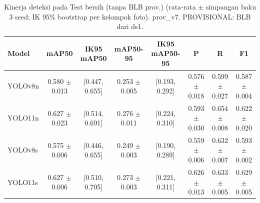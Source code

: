 \begin{table}[!t]
\centering
\caption{Kinerja deteksi pada Test bersih (tanpa BLB prov.) (rata-rata $\pm$ simpangan baku 3 seed; IK 95\% bootstrap per kelompok foto). prov\_v7. PROVISIONAL: BLB dari ds1.}
\label{tab:utama_test_bersih}
\footnotesize
\begin{tabular}{lccccccc}
\hline
\textbf{Model} & \textbf{mAP50} & \textbf{IK95 mAP50} & \textbf{mAP50-95} & \textbf{IK95 mAP50-95} & \textbf{P} & \textbf{R} & \textbf{F1} \\
\hline
YOLOv8n & 0.580 $\pm$ 0.013 & [0.447, 0.655] & 0.253 $\pm$ 0.005 & [0.193, 0.292] & 0.576 $\pm$ 0.018 & 0.599 $\pm$ 0.027 & 0.587 $\pm$ 0.004 \\
YOLO11n & 0.627 $\pm$ 0.023 & [0.514, 0.691] & 0.276 $\pm$ 0.011 & [0.224, 0.310] & 0.593 $\pm$ 0.030 & 0.654 $\pm$ 0.008 & 0.622 $\pm$ 0.020 \\
YOLOv8s & 0.575 $\pm$ 0.006 & [0.446, 0.655] & 0.249 $\pm$ 0.003 & [0.190, 0.289] & 0.559 $\pm$ 0.006 & 0.632 $\pm$ 0.007 & 0.593 $\pm$ 0.002 \\
YOLO11s & 0.627 $\pm$ 0.006 & [0.510, 0.705] & 0.273 $\pm$ 0.003 & [0.221, 0.311] & 0.626 $\pm$ 0.013 & 0.633 $\pm$ 0.005 & 0.629 $\pm$ 0.005 \\
\hline
\end{tabular}
\end{table}
